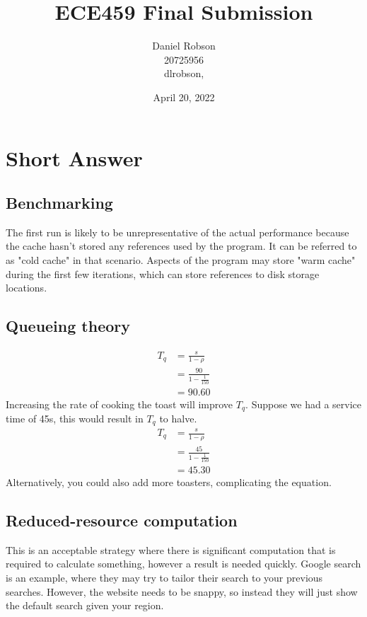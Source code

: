 \documentclass[12pt]{article}
\title{ECE459 Final Submission}
\date{April 20, 2022}
\author{Daniel Robson \\ 20725956 \\ dlrobson, }
\begin{document}
\maketitle
\section{Short Answer}
\subsection{Benchmarking}
The first run is likely to be unrepresentative of the actual performance because the cache hasn't stored any references used by the program.
It can be referred to as "cold cache" in that scenario.
Aspects of the program may store "warm cache" during the first few iterations, which can store references to disk storage locations.

\subsection{Queueing theory}
\begin{equation*}
    \begin{aligned}
        T_q & = \frac{s}{1 - \rho}           \\
            & = \frac{90}{1 - \frac{1}{150}} \\
            & = 90.60
    \end{aligned}
\end{equation*}
Increasing the rate of cooking the toast will improve \(T_q\).
Suppose we had a service time of 45s, this would result in \(T_q\) to halve.
\begin{equation*}
    \begin{aligned}
        T_q & = \frac{s}{1 - \rho}           \\
            & = \frac{45}{1 - \frac{1}{150}} \\
            & = 45.30
    \end{aligned}
\end{equation*}
Alternatively, you could also add more toasters, complicating the equation.


\subsection{Reduced-resource computation}
This is an acceptable strategy where there is significant computation that is required to calculate something, however a result is needed quickly.
Google search is an example, where they may try to tailor their search to your previous searches. However, the website needs to be snappy, so instead they will just show the default search given your region.
\end{document}
